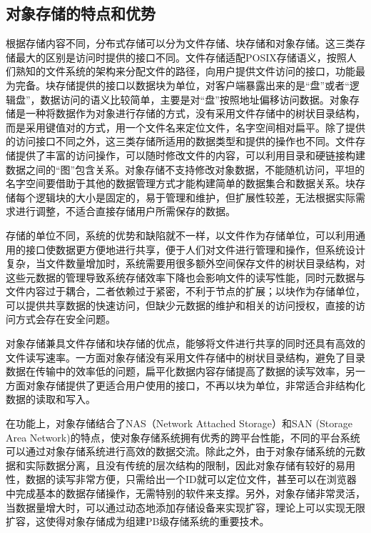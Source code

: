 \subsection{对象存储的特点和优势}%
根据存储内容不同，分布式存储可以分为文件存储、块存储和对象存储。这三类存储最大的区别是访问时提供的接口不同。文件存储适配POSIX存储语义，按照人们熟知的文件系统的架构来分配文件的路径，向用户提供文件访问的接口，功能最为完备。块存储提供的接口以数据块为单位，对客户端暴露出来的是“盘”或者“逻辑盘”，数据访问的语义比较简单，主要是对“盘”按照地址偏移访问数据。对象存储是一种将数据作为对象进行存储的方式，没有采用文件存储中的树状目录结构，而是采用键值对的方式，用一个文件名来定位文件，名字空间相对扁平。除了提供的访问接口不同之外，这三类存储所适用的数据类型和提供的操作也不同。文件存储提供了丰富的访问操作，可以随时修改文件的内容，可以利用目录和硬链接构建数据之间的“图”包含关系。对象存储不支持修改对象数据，不能随机访问，平坦的名字空间要借助于其他的数据管理方式才能构建简单的数据集合和数据关系。块存储每个逻辑块的大小是固定的，易于管理和维护，但扩展性较差，无法根据实际需求进行调整，不适合直接存储用户所需保存的数据。

存储的单位不同，系统的优势和缺陷就不一样，以文件作为存储单位，可以利用通用的接口使数据更方便地进行共享，便于人们对文件进行管理和操作，但系统设计复杂\cite{20}，当文件数量增加时，系统需要用很多额外空间保存文件的树状目录结构，对这些元数据的管理导致系统存储效率下降也会影响文件的读写性能，同时元数据与文件内容过于耦合，二者依赖过于紧密，不利于节点的扩展；以块作为存储单位，可以提供共享数据的快速访问，但缺少元数据的维护和相关的访问授权，直接的访问方式会存在安全问题\cite{21}。

对象存储兼具文件存储和块存储的优点，能够将文件进行共享的同时还具有高效的文件读写速率\cite{22}。一方面对象存储没有采用文件存储中的树状目录结构，避免了目录数据在传输中的效率低的问题，扁平化数据内容存储提高了数据的读写效率，另一方面对象存储提供了更适合用户使用的接口，不再以块为单位，非常适合非结构化数据的读取和写入。

在功能上，对象存储结合了NAS\cite{23}（Network Attached Storage）和SAN\cite{24} (Storage Area Network)的特点，使对象存储系统拥有优秀的跨平台性能\cite{25}，不同的平台系统可以通过对象存储系统进行高效的数据交流。除此之外，由于对象存储系统的元数据和实际数据分离，且没有传统的层次结构的限制，因此对象存储有较好的易用性，数据的读写非常方便，只需给出一个ID就可以定位文件，甚至可以在浏览器中完成基本的数据存储操作，无需特别的软件来支撑。另外，对象存储非常灵活，当数据量增大时，可以通过动态地添加存储设备来实现扩容，理论上可以实现无限扩容，这使得对象存储成为组建PB级存储系统的重要技术。

